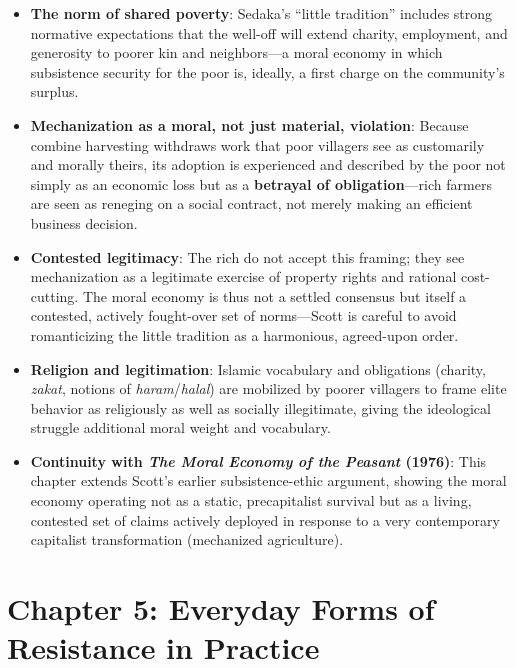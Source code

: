 \documentclass[12pt]{article}
\begin{document}
\begin{itemize}[leftmargin=*, itemsep=4pt]
    \item \textbf{The norm of shared poverty}: Sedaka's ``little tradition'' includes strong normative expectations that the well-off will extend charity, employment, and generosity to poorer kin and neighbors---a moral economy in which subsistence security for the poor is, ideally, a first charge on the community's surplus.
    \item \textbf{Mechanization as a moral, not just material, violation}: Because combine harvesting withdraws work that poor villagers see as customarily and morally theirs, its adoption is experienced and described by the poor not simply as an economic loss but as a \textbf{betrayal of obligation}---rich farmers are seen as reneging on a social contract, not merely making an efficient business decision.
    \item \textbf{Contested legitimacy}: The rich do not accept this framing; they see mechanization as a legitimate exercise of property rights and rational cost-cutting. The moral economy is thus not a settled consensus but itself a contested, actively fought-over set of norms---Scott is careful to avoid romanticizing the little tradition as a harmonious, agreed-upon order.
    \item \textbf{Religion and legitimation}: Islamic vocabulary and obligations (charity, \textit{zakat}, notions of \textit{haram}/\textit{halal}) are mobilized by poorer villagers to frame elite behavior as religiously as well as socially illegitimate, giving the ideological struggle additional moral weight and vocabulary.
    \item \textbf{Continuity with \textit{The Moral Economy of the Peasant} (1976)}: This chapter extends Scott's earlier subsistence-ethic argument, showing the moral economy operating not as a static, precapitalist survival but as a living, contested set of claims actively deployed in response to a very contemporary capitalist transformation (mechanized agriculture).
\end{itemize}

\section{Chapter 5: Everyday Forms of Resistance in Practice}
\end{document}
